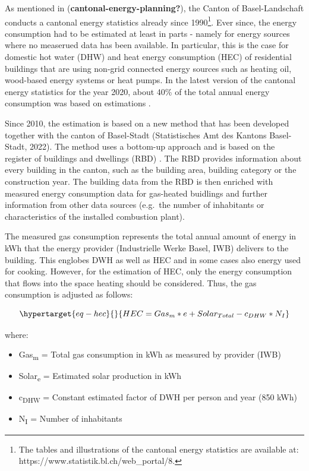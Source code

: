 \documentclass[
  letterpaper,
  DIV=11,
  numbers=noendperiod]{scrreprt}
\begin{document}
As mentioned in (\textbf{cantonal-energy-planning?}), the Canton of
Basel-Landschaft conducts a cantonal energy statistics already since
1990\footnote{The tables and illustrations of the cantonal energy
  statistics are available at:
  https://www.statistik.bl.ch/web\_portal/8.}. Ever since, the energy
consumption had to be estimated at least in parts - namely for energy
sources where no measerued data has been available. In particular, this
is the case for domestic hot water (DHW) and heat energy consumption
(HEC) of residential buildings that are using non-grid connected energy
sources such as heating oil, wood-based energy systems or heat pumps. In
the latest version of the cantonal energy statistics for the year 2020,
about 40\% of the total annual energy consumption was based on
estimations .

Since 2010, the estimation is based on a new method that has been
developed together with the canton of Basel-Stadt (Statistisches Amt des
Kantons Basel-Stadt, 2022). The method uses a bottom-up approach and is
based on the register of buildings and dwellings (RBD) . The RBD
provides information about every building in the canton, such as the
building area, building category or the construction year. The building
data from the RBD is then enriched with measured energy consumption data
for gas-heated buidlings and further information from other data sources
(e.g.~the number of inhabitants or characteristics of the installed
combustion plant).

The measured gas consumption represents the total annual amount of
energy in kWh that the energy provider (Industrielle Werke Basel, IWB)
delivers to the building. This englobes DWH as well as HEC and in some
cases also energy used for cooking. However, for the estimation of HEC,
only the energy consumption that flows into the space heating should be
considered. Thus, the gas consumption is adjusted as follows:

\begin{equation}\protect\hypertarget{eq-hec}{}{HEC = Gas_{m}*e + Solar_{Total} - c_{DHW}*N_{I}}\label{eq-hec}\end{equation}

where:

\begin{itemize}
\item
  Gas\textsubscript{m} = Total gas consumption in kWh as measured by
  provider (IWB)
\item
  Solar\textsubscript{e} = Estimated solar production in kWh
\item
  c\textsubscript{DHW} = Constant estimated factor of DWH per person and
  year (850 kWh)
\item
  N\textsubscript{I} = Number of inhabitants
\end{itemize}
\end{document}
